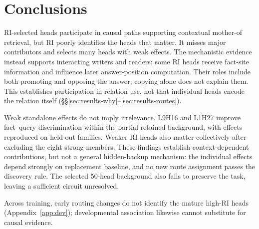 \section{Conclusions}
\label{sec:conclusions}

RI-selected heads participate in causal paths supporting contextual mother-of
retrieval, but RI poorly identifies the heads that matter. It misses major
contributors and selects many heads with weak effects. The mechanistic evidence
instead supports interacting writers and readers: some RI heads receive fact-site
information and influence later answer-position computation. Their roles include
both promoting and opposing the answer; copying alone does not explain them.
This establishes participation in relation use, not that individual heads encode
the relation itself (\S\S\ref{sec:results-why}--\ref{sec:results-routes}).

Weak standalone effects do not imply irrelevance. L9H16 and L1H27 improve
fact--query discrimination within the partial retained background, with effects
reproduced on held-out families. Weaker RI heads also matter collectively after
excluding the eight strong members. These findings establish context-dependent
contributions, but not a general hidden-backup mechanism: the individual effects
depend strongly on replacement baseline, and no new route assignment passes the
discovery rule. The selected 50-head background also fails to preserve the task,
leaving a sufficient circuit unresolved.

Across training, early routing changes do not identify the mature high-RI heads
(Appendix~\ref{app:dev}); developmental association likewise cannot substitute
for causal evidence.
